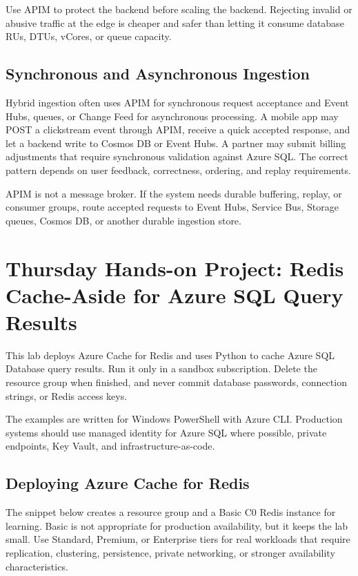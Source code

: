 \begin{tipbox}
Use APIM to protect the backend before scaling the backend. Rejecting invalid or abusive traffic at the edge is cheaper and safer than letting it consume database RUs, DTUs, vCores, or queue capacity.
\end{tipbox}

\subsection{Synchronous and Asynchronous Ingestion}
Hybrid ingestion often uses APIM for synchronous request acceptance and Event Hubs, queues, or Change Feed for asynchronous processing. A mobile app may POST a clickstream event through APIM, receive a quick accepted response, and let a backend write to Cosmos DB or Event Hubs. A partner may submit billing adjustments that require synchronous validation against Azure SQL. The correct pattern depends on user feedback, correctness, ordering, and replay requirements.

\begin{notebox}
APIM is not a message broker. If the system needs durable buffering, replay, or consumer groups, route accepted requests to Event Hubs, Service Bus, Storage queues, Cosmos DB, or another durable ingestion store.
\end{notebox}

\section{Thursday Hands-on Project: Redis Cache-Aside for Azure SQL Query Results}
This lab deploys Azure Cache for Redis and uses Python to cache Azure SQL Database query results. Run it only in a sandbox subscription. Delete the resource group when finished, and never commit database passwords, connection strings, or Redis access keys.

\begin{notebox}
The examples are written for Windows PowerShell with Azure CLI. Production systems should use managed identity for Azure SQL where possible, private endpoints, Key Vault, and infrastructure-as-code.
\end{notebox}

\subsection{Deploying Azure Cache for Redis}
The snippet below creates a resource group and a Basic C0 Redis instance for learning. Basic is not appropriate for production availability, but it keeps the lab small. Use Standard, Premium, or Enterprise tiers for real workloads that require replication, clustering, persistence, private networking, or stronger availability characteristics.


